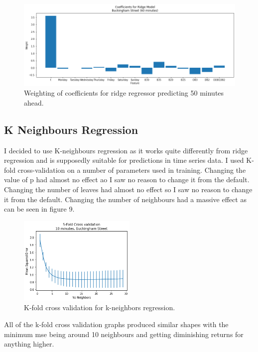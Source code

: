 \begin{figure}[H]
    \centering
    \includegraphics[width=1\textwidth]{images/coefficients5.png}
    \caption{Weighting of coefficients for ridge regressor predicting 50 minutes ahead.}
    \end{figure}
\par 


\subsection{K Neighbours Regression}

I decided to use K-neighbours regression as it works quite differently from ridge regression and is supposedly suitable for predictions in time series data.
I used K-fold cross-validation on a number of parameters used in training.
Changing the value of p had almost no effect ao I saw no reason to change it from the default.
Changing the number of leaves had almost no effect so I saw no reason to change it from the default.
Changing the number of neighbours had a massive effect as can be seen in figure 9.

\begin{figure}[H]
    \centering
    \includegraphics[width=0.5\textwidth]{images/neighbors_kfold1.png}
    \caption{K-fold cross validation for k-neighbors regression.}
    \end{figure}
\par 

All of the k-fold cross validation graphs produced similar shapes with the minimum mse being around 10 neighbours and getting diminishing returns for anything higher.

